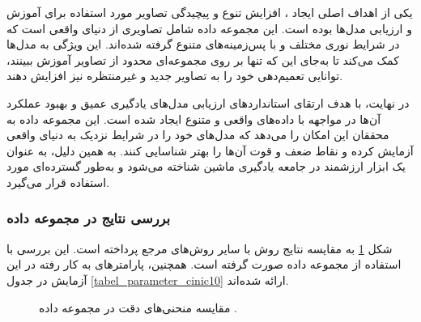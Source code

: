 یکی از اهداف اصلی ایجاد
،
افزایش تنوع و پیچیدگی تصاویر مورد استفاده برای آموزش و ارزیابی مدل‌ها بوده است. این مجموعه داده شامل تصاویری از دنیای واقعی است که در شرایط نوری مختلف و با پس‌زمینه‌های متنوع گرفته شده‌اند. این ویژگی به مدل‌ها کمک می‌کند تا به‌جای این که تنها بر روی مجموعه‌ای محدود از تصاویر آموزش ببینند، توانایی تعمیم‌دهی خود را به تصاویر جدید و غیرمنتظره نیز افزایش دهند.

در نهایت،
با هدف ارتقای استانداردهای ارزیابی مدل‌های یادگیری عمیق و بهبود عملکرد آن‌ها در مواجهه با داده‌های واقعی و متنوع ایجاد شده است. این مجموعه داده به محققان این امکان را می‌دهد که مدل‌های خود را در شرایط نزدیک به دنیای واقعی آزمایش کرده و نقاط ضعف و قوت آن‌ها را بهتر شناسایی کنند. به همین دلیل،
به عنوان یک ابزار ارزشمند در جامعه یادگیری ماشین شناخته می‌شود و به‌طور گسترده‌ای مورد استفاده قرار می‌گیرد.


\vspace{3mm}
\subsubsection{
	بررسی نتایج در مجموعه داده
}\vspace{-1mm}


شکل
\ref{result_cinic10}
به مقایسه نتایج روش
با سایر روش‌های مرجع پرداخته است. این بررسی با استفاده از مجموعه داده
صورت گرفته است. همچنین، پارامترهای به کار رفته در این آزمایش در جدول
\ref{tabel_parameter_cinic10}
ارائه شده‌اند.

\begin{figure}[b!]
	\centering
	\hspace{0.8mm}
	\caption{
		مقایسه منحنی‌های دقت در مجموعه داده
		.
	}
	\label{result_cinic10}
\end{figure}


